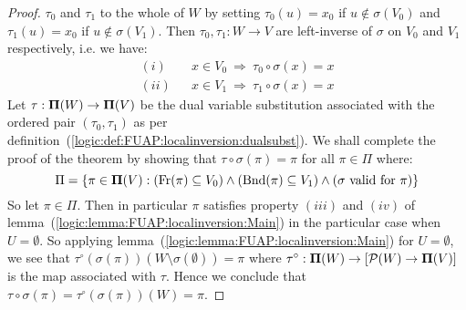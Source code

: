 \begin{proof}
$\tau_{0}$ and $\tau_{1}$ to the whole of $W$ by setting
$\tau_{0}(u)=x_{0}$ if $u\not\in\sigma(V_{0})$ and
$\tau_{1}(u)=x_{0}$ if $u\not\in\sigma(V_{1})$. Then $\tau_{0},
\tau_{1}:W\to V$ are left-inverse of $\sigma$ on $V_{0}$ and $V_{1}$
respectively, i.e. we have:
    \begin{eqnarray*}
    (i)&&x\in V_{0}\ \Rightarrow\ \tau_{0}\circ\sigma(x)=x\\
    (ii)&&x\in V_{1}\ \Rightarrow\ \tau_{1}\circ\sigma(x)=x
    \end{eqnarray*}
Let $\tau:{\bf\Pi}(W)\to\mbox{${\bf\Pi}(V)$}$ be the dual variable substitution
associated with the ordered pair $(\tau_{0},\tau_{1})$ as per
definition~(\ref{logic:def:FUAP:localinversion:dualsubst}). We shall
complete the proof of the theorem by showing that
$\tau\circ\sigma(\pi)=\pi$ for all $\pi\in\Pi$ where:
    \[
    \Pi=\{\pi\in\mbox{${\bf\Pi}(V)$}:(\mbox{\rm Fr}(\pi)\subseteq
    V_{0})\land(\mbox{\rm Bnd}(\pi)\subseteq V_{1})\land(\mbox{$\sigma$
    valid for $\pi$})\}
    \]
So let $\pi\in\Pi$. Then in particular $\pi$ satisfies property
$(iii)$ and $(iv)$ of
lemma~(\ref{logic:lemma:FUAP:localinversion:Main}) in the particular
case when $U=\emptyset$. So applying
lemma~(\ref{logic:lemma:FUAP:localinversion:Main}) for
$U=\emptyset$, we see that
$\tau^{\circ}(\sigma(\pi))(W\setminus\sigma(\emptyset))=\pi$ where
$\tau^{\circ}:{\bf\Pi}(W)\to[{\cal P}(W)\to\mbox{${\bf\Pi}(V)$}]$ is the map
associated with $\tau$. Hence we conclude that
$\tau\circ\sigma(\pi)=\tau^{\circ}(\sigma(\pi))(W)=\pi$.
\end{proof}
